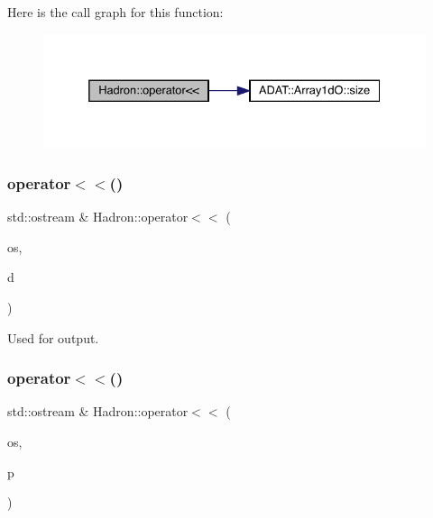 Here is the call graph for this function\+:
\nopagebreak
\begin{figure}[H]
\begin{center}
\leavevmode
\includegraphics[width=332pt]{d1/daf/namespaceHadron_a0dfff614f40f815cfb78d828c07bc8aa_cgraph}
\end{center}
\end{figure}
\mbox{\label{namespaceHadron_ac4fad3eded4cdc1e5e3a20c089ff92c7}} 
\subsubsection{\texorpdfstring{operator$<$$<$()}{operator<<()}\hspace{0.1cm}{\footnotesize\ttfamily [36/48]}}
{\footnotesize\ttfamily std\+::ostream \& Hadron\+::operator$<$$<$ (\begin{DoxyParamCaption}\item[{std\+::ostream \&}]{os,  }\item[{const \mbox{\hyperlink{structHadron_1_1HadronVertex__t}{Hadron\+Vertex\+\_\+t}} \&}]{d }\end{DoxyParamCaption})}



Used for output. 

\mbox{\label{namespaceHadron_a7fed56ec5f5f96e9e160939d5b138184}} 
\subsubsection{\texorpdfstring{operator$<$$<$()}{operator<<()}\hspace{0.1cm}{\footnotesize\ttfamily [37/48]}}
{\footnotesize\ttfamily std\+::ostream \& Hadron\+::operator$<$$<$ (\begin{DoxyParamCaption}\item[{std\+::ostream \&}]{os,  }\item[{const \mbox{\hyperlink{structHadron_1_1HadronDiagramTimeSlices__t}{Hadron\+Diagram\+Time\+Slices\+\_\+t}} \&}]{p }\end{DoxyParamCaption})}

